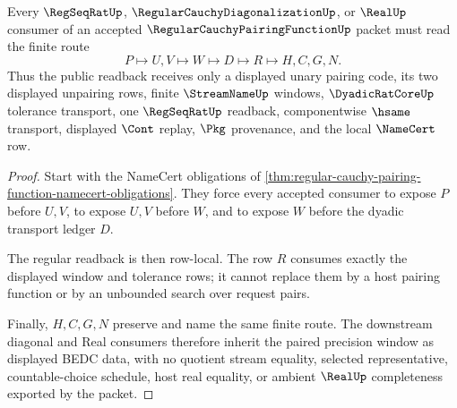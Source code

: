 \begin{theorem}
\label{thm:regular-cauchy-pairing-window-exactness}
Every $\RegSeqRatUp$, $\RegularCauchyDiagonalizationUp$, or $\RealUp$ consumer of an accepted $\RegularCauchyPairingFunctionUp$ packet must read the finite route
$$
P \longmapsto U,V \longmapsto W \longmapsto D \longmapsto R \longmapsto H,C,G,N .
$$
Thus the public readback receives only a displayed unary pairing code, its two displayed unpairing rows, finite $\StreamNameUp$ windows, $\DyadicRatCoreUp$ tolerance transport, one $\RegSeqRatUp$ readback, componentwise $\hsame$ transport, displayed $\Cont$ replay, $\Pkg$ provenance, and the local $\NameCert$ row.
\end{theorem}
\begin{proof}
Start with the NameCert obligations of \autoref{thm:regular-cauchy-pairing-function-namecert-obligations}. They force every accepted consumer to expose $P$ before $U,V$, to expose $U,V$ before $W$, and to expose $W$ before the dyadic transport ledger $D$.

The regular readback is then row-local. The row $R$ consumes exactly the displayed window and tolerance rows; it cannot replace them by a host pairing function or by an unbounded search over request pairs.

Finally, $H,C,G,N$ preserve and name the same finite route. The downstream diagonal and Real consumers therefore inherit the paired precision window as displayed BEDC data, with no quotient stream equality, selected representative, countable-choice schedule, host real equality, or ambient $\RealUp$ completeness exported by the packet.
\end{proof}



